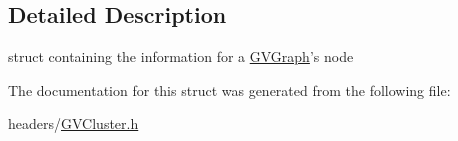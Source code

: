 \subsection{\-Detailed \-Description}
struct containing the information for a \hyperlink{class_g_v_graph}{\-G\-V\-Graph}'s node 

\-The documentation for this struct was generated from the following file\-:\begin{DoxyCompactItemize}
\item 
headers/\hyperlink{_g_v_cluster_8h}{\-G\-V\-Cluster.\-h}\end{DoxyCompactItemize}
